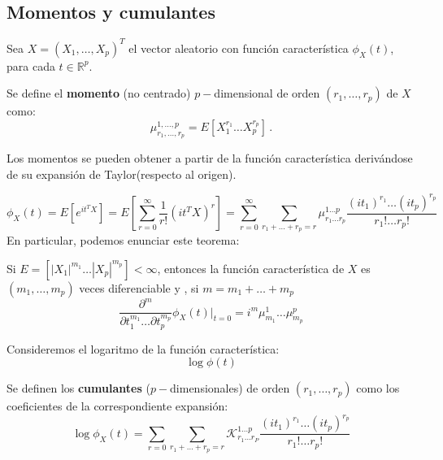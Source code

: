\subsection{Momentos y cumulantes}

Sea $X= (X_1,\dots,X_p)^T$ el vector aleatorio con función característica $\phi_X(t)$, para cada $t\in \mathbb R^p$.
\begin{ndef}
  Se define el \textbf{momento} (no centrado) $p-$dimensional de orden $(r_1, \dots, r_p)$ de $X$ como:
  \[
\mu_{r_1,\dots,r_p}^{1,\dots,p} = E [ X_1^{r_1} \dots X_p^{r_p}]\,.
  \]
\end{ndef}

Los momentos se pueden obtener a partir de la función característica derivándose de su expansión de Taylor(respecto al origen).

\[
\phi_X(t) = E[e^{it^T X}] = E[\sum_{r=0}^\infty \frac{1}{r!}(i t^T X)^r] = \sum_{r= 0}^\infty \sum _{r_1+\dots + r_p = r} \mu_{r_1 \dots r_p}^{1 \dots p} \frac{(it_1)^{r_1} \dots (it_p)^{r_p}}{r_1 ! \dots r_p !}
\]
En particular, podemos enunciar este teorema:
\begin{nth}
  Si $E=[|X_1|^{m_1} \dots |X_p|^{m_p}] < \infty$, entonces la función característica de $X$ es $(m_1, \dots, m_p)$ veces diferenciable y , si $m = m_1 + \dots + m_p$
  \[
\frac{\partial ^m}{\partial t_1^{m_1} \dots \partial t_p^{m_p}} \phi_X(t)| _{t = 0} = i^m \mu_{m_1}^1 \dots \mu_{m_p}^p
  \]
\end{nth}

Consideremos el logaritmo de la función característica:
\[
\log \phi(t)
\]
\begin{ndef}
  Se definen los \textbf{cumulantes} ($p-$dimensionales) de orden $(r_1 , \dots, r_p)$ como los coeficientes de la correspondiente expansión:
  \[
  \log \phi_X(t) =  \sum_{r= 0} \sum_{r_1+\dots + r_p = r} \mathcal K_{r_1 \dots r_P}^{1\dots p} \frac{(it_1)^{r_1} \dots (it_p)^{r_p}}{r_1 ! \dots r_p !}
  \]
\end{ndef}

